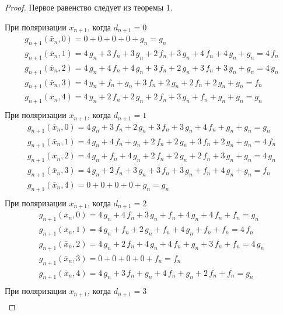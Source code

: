 \documentclass[bibliography=totoc, a4paper, 14pt]{extarticle}
\begin{document}
\begin{proof}

Первое равенство следует из теоремы 1.

При поляризации $x_{n+1}$, когда $d_{n+1} = 0$
$$\begin{array}{l}
g_{n+1}(\bar{x}_n, 0) = 0 + 0 + 0 + 0 + g_n = g_n \\
g_{n+1}(\bar{x}_n, 1) = 4\,g_n + 3\,f_n + 3\,g_n + 2\,f_n + 3\,g_n + 4\,f_n + 4\,g_n + g_n = 4\,f_n \\
g_{n+1}(\bar{x}_n, 2) = 4\,g_n + 4\,f_n + 4\,g_n + 3\,f_n + 2\,g_n + 3\,f_n + 3\,g_n + g_n = 4\,g_n \\
g_{n+1}(\bar{x}_n, 3) = 4\,g_n + f_n + g_n + 3\,f_n + 2\,g_n + 2\,f_n + 2\,g_n + g_n = f_n \\
g_{n+1}(\bar{x}_n, 4) = 4\,g_n + 2\,f_n + 2\,g_n + 2\,f_n + 3\,g_n + f_n + g_n + g_n = g_n \\
\end{array}$$
При поляризации $x_{n+1}$, когда $d_{n+1} = 1$
$$\begin{array}{l}
g_{n+1}(\bar{x}_n, 0) = 4\,g_n + 3\,f_n + 2\,g_n + 3\,f_n + 3\,g_n + 4\,f_n + g_n + g_n = g_n \\
g_{n+1}(\bar{x}_n, 1) = 4\,g_n + 4\,f_n + g_n + 2\,f_n + 2\,g_n + 3\,f_n + 2\,g_n + g_n = 4\,f_n \\
g_{n+1}(\bar{x}_n, 2) = 4\,g_n + f_n + 4\,g_n + 2\,f_n + 2\,g_n + 2\,f_n + 3\,g_n + g_n = 4\,g_n \\
g_{n+1}(\bar{x}_n, 3) = 4\,g_n + 2\,f_n + 3\,g_n + 3\,f_n + 3\,g_n + f_n + 4\,g_n + g_n = f_n \\
g_{n+1}(\bar{x}_n, 4) = 0 + 0 + 0 + 0 + g_n = g_n \\
\end{array}$$
При поляризации $x_{n+1}$, когда $d_{n+1} = 2$
$$\begin{array}{l}
g_{n+1}(\bar{x}_n, 0) = 4\,g_n + 4\,f_n + 3\,g_n + f_n + 4\,g_n + 4\,f_n + f_n = g_n \\
g_{n+1}(\bar{x}_n, 1) = 4\,g_n + f_n + 2\,g_n + f_n + 4\,g_n + f_n + f_n = 4\,f_n \\
g_{n+1}(\bar{x}_n, 2) = 4\,g_n + 2\,f_n + 4\,g_n + 4\,f_n + g_n + 3\,f_n + f_n = 4\,g_n \\
g_{n+1}(\bar{x}_n, 3) = 0 + 0 + 0 + 0 + f_n = f_n \\
g_{n+1}(\bar{x}_n, 4) = 4\,g_n + 3\,f_n + g_n + 4\,f_n + g_n + 2\,f_n + f_n = g_n \\
\end{array}$$
При поляризации $x_{n+1}$, когда $d_{n+1} = 3$
$$\begin{array}{l}

\end{array}$$
\end{proof}
\end{document}
